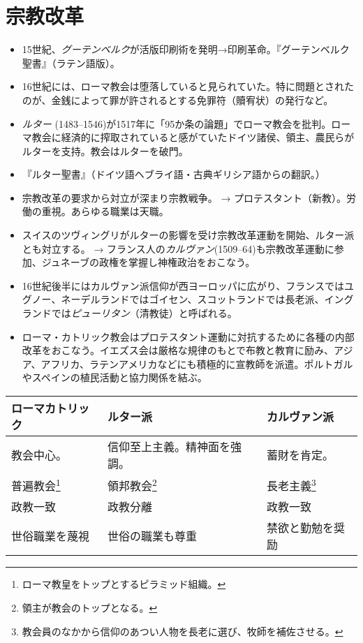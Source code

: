 \documentclass[uplatex,dvipdfmx]{jsarticle} \usepackage{mystyle}%
\begin{document}
\section{宗教改革}
\begin{itemize}

\item 15世紀、\emph{グーテンベルク}が活版印刷術を発明→印刷革命。『グーテンベルク聖書』（ラテン語版）。

  
\item 16世紀には、ローマ教会は堕落していると見られていた。特に問題とされたのが、金銭によって罪が許されるとする免罪符（贖宥状）の発行など。

\item \emph{ルター} (1483--1546)が1517年に「95か条の論題」でローマ教会を批判。ローマ教会に経済的に搾取されていると感がていたドイツ諸侯、領主、農民らがルターを支持。教会はルターを破門。
  
\item 『ルター聖書』（ドイツ語ヘブライ語・古典ギリシア語からの翻訳。）

\item 宗教改革の要求から対立が深まり宗教戦争。 → プロテスタント（新教）。労働の重視。あらゆる職業は天職。

\item スイスのツヴィングリがルターの影響を受け宗教改革運動を開始、ルター派とも対立する。 →
フランス人の\emph{カルヴァン}(1509--64)も宗教改革運動に参加、ジュネーブの政権を掌握し神権政治をおこなう。

\item 16世紀後半にはカルヴァン派信仰が西ヨーロッパに広がり、フランスではユグノー、ネーデルランドではゴイセン、スコットランドでは長老派、イングランドでは\emph{ピューリタン}（清教徒）と呼ばれる。

\item ローマ・カトリック教会はプロテスタント運動に対抗するために各種の内部改革をおこなう。イエズス会は厳格な規律のもとで布教と教育に励み、アジア、アフリカ、ラテンアメリカなどにも積極的に宣教師を派遣。ポルトガルやスペインの植民活動と協力関係を結ぶ。

\end{itemize}

\vspace{1zw}

\begin{tabularx}{1.0\linewidth}{X X X}

  ローマカトリック  & ルター派 & カルヴァン派 \\ \hline

  教会中心。& 信仰至上主義。精神面を強調。 & 蓄財を肯定。 \\
  普遍教会\footnote{ローマ教皇をトップとするピラミッド組織。} & 領邦教会\footnote{領主が教会のトップとなる。} & 長老主義\footnote{教会員のなかから信仰のあつい人物を長老に選び、牧師を補佐させる。} \\
  政教一致 & 政教分離 & 政教一致 \\
  世俗職業を蔑視 & 世俗の職業も尊重 & 禁欲と勤勉を奨励  \\

\end{tabularx}
\vspace{1zw}
\end{document}
